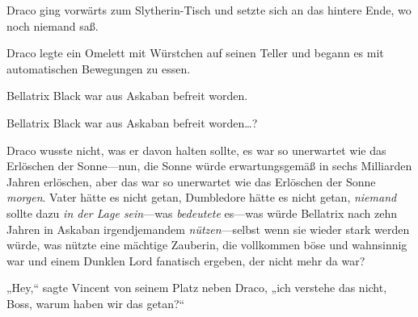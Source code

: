 Draco ging vorwärts zum Slytherin-Tisch und setzte sich an das hintere Ende, wo noch niemand saß.

Draco legte ein Omelett mit Würstchen auf seinen Teller und begann es mit automatischen Bewegungen zu essen.

Bellatrix Black war aus Askaban befreit worden.

Bellatrix Black war aus Askaban befreit worden…?

Draco wusste nicht, was er davon halten sollte, es war so unerwartet wie das Erlöschen der Sonne—nun, die Sonne würde erwartungsgemäß in sechs Milliarden Jahren erlöschen, aber das war so unerwartet wie das Erlöschen der Sonne \emph{morgen}. Vater hätte es nicht getan, Dumbledore hätte es nicht getan, \emph{niemand} sollte dazu \emph{in der Lage sein}—was \emph{bedeutete} es—was würde Bellatrix nach zehn Jahren in Askaban irgendjemandem \emph{nützen}—selbst wenn sie wieder stark werden würde, was nützte eine mächtige Zauberin, die vollkommen böse und wahnsinnig war und einem Dunklen Lord fanatisch ergeben, der nicht mehr da war?

„Hey,“ sagte Vincent von seinem Platz neben Draco, „ich verstehe das nicht, Boss, warum haben wir das getan?“

